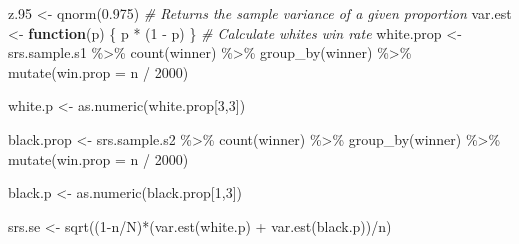 \documentclass[11pt,]{article}
\newenvironment{Shaded}{\begin{snugshade}}{\end{snugshade}}
\newcommand{\AttributeTok}[1]{\textcolor[rgb]{0.77,0.63,0.00}{#1}}
\newcommand{\CommentTok}[1]{\textcolor[rgb]{0.56,0.35,0.01}{\textit{#1}}}
\newcommand{\ControlFlowTok}[1]{\textcolor[rgb]{0.13,0.29,0.53}{\textbf{#1}}}
\newcommand{\DecValTok}[1]{\textcolor[rgb]{0.00,0.00,0.81}{#1}}
\newcommand{\FloatTok}[1]{\textcolor[rgb]{0.00,0.00,0.81}{#1}}
\newcommand{\FunctionTok}[1]{\textcolor[rgb]{0.00,0.00,0.00}{#1}}
\newcommand{\NormalTok}[1]{#1}
\newcommand{\OtherTok}[1]{\textcolor[rgb]{0.56,0.35,0.01}{#1}}
\newcommand{\SpecialCharTok}[1]{\textcolor[rgb]{0.00,0.00,0.00}{#1}}
\begin{document}
\begin{Shaded}
\begin{Highlighting}[]
\NormalTok{z}\FloatTok{.95} \OtherTok{\textless{}{-}} \FunctionTok{qnorm}\NormalTok{(}\FloatTok{0.975}\NormalTok{)}
\CommentTok{\# Returns the sample variance of a given proportion}
\NormalTok{var.est }\OtherTok{\textless{}{-}} \ControlFlowTok{function}\NormalTok{(p) \{}
\NormalTok{  p }\SpecialCharTok{*}\NormalTok{ (}\DecValTok{1} \SpecialCharTok{{-}}\NormalTok{ p)}
\NormalTok{\}}
\CommentTok{\# Calculate white\textquotesingle{}s win rate}
\NormalTok{white.prop }\OtherTok{\textless{}{-}}\NormalTok{ srs.sample.s1 }\SpecialCharTok{\%\textgreater{}\%}
  \FunctionTok{count}\NormalTok{(winner) }\SpecialCharTok{\%\textgreater{}\%}
  \FunctionTok{group\_by}\NormalTok{(winner) }\SpecialCharTok{\%\textgreater{}\%}
  \FunctionTok{mutate}\NormalTok{(}\AttributeTok{win.prop =}\NormalTok{ n }\SpecialCharTok{/} \DecValTok{2000}\NormalTok{)}

\NormalTok{white.p }\OtherTok{\textless{}{-}} \FunctionTok{as.numeric}\NormalTok{(white.prop[}\DecValTok{3}\NormalTok{,}\DecValTok{3}\NormalTok{])}

\NormalTok{black.prop }\OtherTok{\textless{}{-}}\NormalTok{ srs.sample.s2 }\SpecialCharTok{\%\textgreater{}\%}
  \FunctionTok{count}\NormalTok{(winner) }\SpecialCharTok{\%\textgreater{}\%}
  \FunctionTok{group\_by}\NormalTok{(winner) }\SpecialCharTok{\%\textgreater{}\%}
  \FunctionTok{mutate}\NormalTok{(}\AttributeTok{win.prop =}\NormalTok{ n }\SpecialCharTok{/} \DecValTok{2000}\NormalTok{)}

\NormalTok{black.p }\OtherTok{\textless{}{-}} \FunctionTok{as.numeric}\NormalTok{(black.prop[}\DecValTok{1}\NormalTok{,}\DecValTok{3}\NormalTok{])}

\NormalTok{srs.se }\OtherTok{\textless{}{-}} \FunctionTok{sqrt}\NormalTok{((}\DecValTok{1}\SpecialCharTok{{-}}\NormalTok{n}\SpecialCharTok{/}\NormalTok{N)}\SpecialCharTok{*}\NormalTok{(}\FunctionTok{var.est}\NormalTok{(white.p) }\SpecialCharTok{+} \FunctionTok{var.est}\NormalTok{(black.p))}\SpecialCharTok{/}\NormalTok{n)}
\end{Highlighting}
\end{Shaded}
\end{document}

